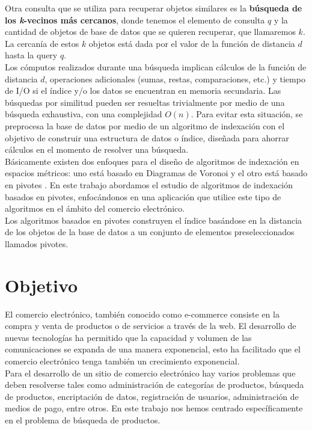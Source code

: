 Otra consulta que se utiliza para recuperar objetos similares es la \textbf{b\'usqueda de los \textit{k}-vecinos m\'as cercanos}, donde tenemos el elemento de consulta $q$ y la cantidad de objetos de base de datos que se quieren recuperar, que llamaremos $k$. La cercan\'ia de estos $k$ objetos est\'a dada por el valor de la funci\'on de distancia $d$ hasta la query $q$.\\
				
Los c\'omputos realizados durante una b\'usqueda implican c\'alculos de la funci\'on de distancia $d$, operaciones adicionales (sumas, restas, comparaciones, etc.) y tiempo de I/O si el \'indice y/o los datos se encuentran en memoria secundaria. Las b\'usquedas por similitud pueden ser resueltas trivialmente por medio de una b\'usqueda exhaustiva, con una complejidad $O(n)$. Para evitar esta situaci\'on, se preprocesa la base de datos por medio de un algoritmo de indexaci\'on con el objetivo de construir una estructura de datos o \'indice, diseñada para ahorrar c\'alculos en el momento de resolver una b\'usqueda.\\
					
B\'asicamente existen dos enfoques para el diseño de algoritmos de indexaci\'on en espacios m\'etricos: uno est\'a basado en Diagramas de Voronoi \cite{oursurvey} y el otro est\'a basado en pivotes \cite{oursurvey}. En este trabajo abordamos el estudio de algoritmos de indexaci\'on basados en pivotes, enfoc\'andonos en una aplicaci\'on que utilice este tipo de algoritmos en el \'ambito del comercio electr\'onico.\\
					
Los algoritmos basados en pivotes construyen el \'indice bas\'andose en la distancia de los objetos de la base de datos a un conjunto de elementos preseleccionados llamados pivotes.

\section{Objetivo}

El comercio electr\'onico, tambi\'en conocido como e-commerce consiste en la compra y venta de productos o de servicios a trav\'es de la web. El desarrollo de nuevas tecnolog\'ias ha permitido que la capacidad y volumen de las comunicaciones se expanda de una manera exponencial, esto ha facilitado que el comercio electr\'onico tenga tambi\'en un crecimiento exponencial.\\
					
Para el desarrollo de un sitio de comercio electr\'onico hay varios problemas que deben resolverse tales como administraci\'on de categor\'ias de productos, b\'usqueda de productos, encriptaci\'on de datos, registraci\'on de usuarios, administraci\'on de medios de pago, entre otros. En este trabajo nos hemos centrado espec\'ificamente en el problema de b\'usqueda de productos.\\
					
